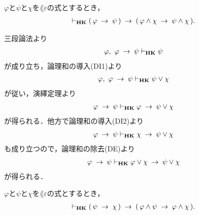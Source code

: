 	\begin{screen}
		\begin{thm}[含意の論理和への遺伝性]
		\label{classic:heredity_of_implication_to_disjunction}
			$\varphi$と$\psi$と$\chi$を$\lang{\varepsilon}$の式とするとき，
			\begin{align}
				\vdash_{{\scriptsize \mbox{{\bf HK}}}} (\, \varphi \hspace{0.25em}\rightarrow\hspace{0.25em} \psi\, )
				\hspace{0.25em}\rightarrow\hspace{0.25em} (\, \varphi \wedge \chi \hspace{0.25em}\rightarrow\hspace{0.25em} \psi \wedge \chi\, ).
			\end{align}
		\end{thm}
	\end{screen}
	
	\begin{sketch}
		三段論法より
		\begin{align}
			\varphi,\ \varphi \hspace{0.25em}\rightarrow\hspace{0.25em} \psi \vdash_{{\scriptsize \mbox{{\bf HK}}}} \psi
		\end{align}
		が成り立ち，論理和の導入(DI1)より
		\begin{align}
			\varphi,\ \varphi \hspace{0.25em}\rightarrow\hspace{0.25em} \psi \vdash_{{\scriptsize \mbox{{\bf HK}}}} \psi \vee \chi
		\end{align}
		が従い，演繹定理より
		\begin{align}
			\varphi \hspace{0.25em}\rightarrow\hspace{0.25em} \psi \vdash_{{\scriptsize \mbox{{\bf HK}}}} 
			\varphi \hspace{0.25em}\rightarrow\hspace{0.25em} \psi \vee \chi
		\end{align}
		が得られる．他方で論理和の導入(DI2)より
		\begin{align}
			\varphi \hspace{0.25em}\rightarrow\hspace{0.25em} \psi \vdash_{{\scriptsize \mbox{{\bf HK}}}} 
			\chi \hspace{0.25em}\rightarrow\hspace{0.25em} \psi \vee \chi
		\end{align}
		も成り立つので，論理和の除去(DE)より
		\begin{align}
			\varphi \hspace{0.25em}\rightarrow\hspace{0.25em} \psi \vdash_{{\scriptsize \mbox{{\bf HK}}}} 
			\varphi \vee \chi \hspace{0.25em}\rightarrow\hspace{0.25em} \psi \vee \chi
		\end{align}
		が得られる．
		\QED
	\end{sketch}
	
	\begin{screen}
		\begin{thm}[含意の論理積への遺伝性]
		\label{classic:heredity_of_implication_to_conjunction}
			$\varphi$と$\psi$と$\chi$を$\lang{\varepsilon}$の式とするとき，
			\begin{align}
				\vdash_{{\scriptsize \mbox{{\bf HK}}}} (\, \psi \hspace{0.25em}\rightarrow\hspace{0.25em} \chi\, )
				\hspace{0.25em}\rightarrow\hspace{0.25em} (\, \varphi \wedge \psi \hspace{0.25em}\rightarrow\hspace{0.25em} \varphi \wedge \chi\, ).
			\end{align}
		\end{thm}
	\end{screen}
	
